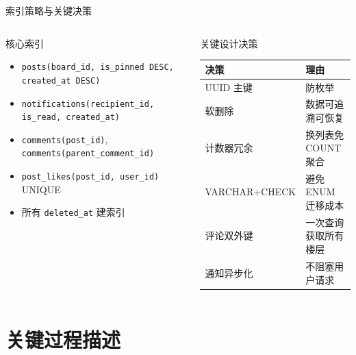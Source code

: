 \documentclass[aspectratio=169,UTF8]{ctexbeamer}
\begin{document}
\begin{frame}{索引策略与关键决策}
    \begin{columns}[T]
        \begin{block}{核心索引}
            \begin{itemize}
                \item \texttt{posts(board\_id, is\_pinned DESC, created\_at DESC)}
                \item \texttt{notifications(recipient\_id, is\_read, created\_at)}
                \item \texttt{comments(post\_id)}, \texttt{comments(parent\_comment\_id)}
                \item \texttt{post\_likes(post\_id, user\_id)} UNIQUE
                \item 所有 \texttt{deleted\_at} 建索引
            \end{itemize}
        \end{block}
        \begin{block}{关键设计决策}
            \small
            \begin{tabularx}{\linewidth}{lX}
                \toprule
                \textbf{决策} & \textbf{理由} \\
                \midrule
                UUID 主键 & 防枚举 \\
                软删除 & 数据可追溯可恢复 \\
                计数器冗余 & 换列表免 COUNT 聚合 \\
                VARCHAR+CHECK & 避免 ENUM 迁移成本 \\
                评论双外键 & 一次查询获取所有楼层 \\
                通知异步化 & 不阻塞用户请求 \\
                \bottomrule
            \end{tabularx}
        \end{block}
    \end{columns}
\end{frame}

\section{关键过程描述}
\end{document}
